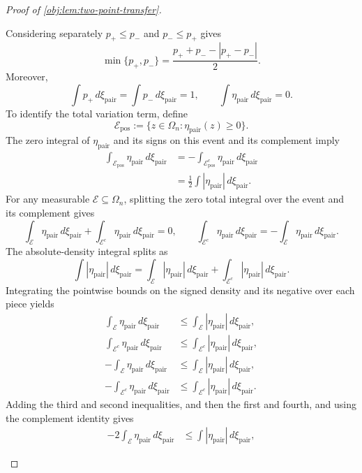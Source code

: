 \begin{proof}[Proof of \cref{obj:lem:two-point-transfer}]
\begin{enumerate}
Considering separately \(p_+\le p_-\) and \(p_-\le p_+\) gives
\[
\min\{p_+,p_-\}
=
\frac{p_++p_--|p_+-p_-|}{2}.
\]
Moreover,
\[
\int p_+\,d\xi_{\mathrm{pair}}
=
\int p_-\,d\xi_{\mathrm{pair}}
=1,
\qquad
\int\eta_{\mathrm{pair}}\,d\xi_{\mathrm{pair}}=0.
\]
To identify the total variation term, define
\[
\mathcal E_{\mathrm{pos}}
:=
\{z\in\Omega_n:\eta_{\mathrm{pair}}(z)\ge0\}.
\]
The zero integral of \(\eta_{\mathrm{pair}}\) and its signs on this event and its complement imply
\[
\begin{aligned}
\int_{\mathcal E_{\mathrm{pos}}}\eta_{\mathrm{pair}}\,d\xi_{\mathrm{pair}}
&=
-\int_{\mathcal E_{\mathrm{pos}}^c}\eta_{\mathrm{pair}}\,d\xi_{\mathrm{pair}}
\\
&=
\frac12\int|\eta_{\mathrm{pair}}|\,d\xi_{\mathrm{pair}}.
\end{aligned}
\]
For any measurable \(\mathcal E\subseteq\Omega_n\), splitting the zero total integral over the event and its complement gives
\[
\int_{\mathcal E}\eta_{\mathrm{pair}}\,d\xi_{\mathrm{pair}}
+
\int_{\mathcal E^c}\eta_{\mathrm{pair}}\,d\xi_{\mathrm{pair}}
=0,
\qquad
\int_{\mathcal E^c}\eta_{\mathrm{pair}}\,d\xi_{\mathrm{pair}}
=
-\int_{\mathcal E}\eta_{\mathrm{pair}}\,d\xi_{\mathrm{pair}}.
\]
The absolute-density integral splits as
\[
\int|\eta_{\mathrm{pair}}|\,d\xi_{\mathrm{pair}}
=
\int_{\mathcal E}|\eta_{\mathrm{pair}}|\,d\xi_{\mathrm{pair}}
+
\int_{\mathcal E^c}|\eta_{\mathrm{pair}}|\,d\xi_{\mathrm{pair}}.
\]
Integrating the pointwise bounds on the signed density and its negative over each piece yields
\[
\begin{aligned}
\int_{\mathcal E}\eta_{\mathrm{pair}}\,d\xi_{\mathrm{pair}}
&\le\int_{\mathcal E}|\eta_{\mathrm{pair}}|\,d\xi_{\mathrm{pair}},
\\
\int_{\mathcal E^c}\eta_{\mathrm{pair}}\,d\xi_{\mathrm{pair}}
&\le\int_{\mathcal E^c}|\eta_{\mathrm{pair}}|\,d\xi_{\mathrm{pair}},
\\
-\int_{\mathcal E}\eta_{\mathrm{pair}}\,d\xi_{\mathrm{pair}}
&\le\int_{\mathcal E}|\eta_{\mathrm{pair}}|\,d\xi_{\mathrm{pair}},
\\
-\int_{\mathcal E^c}\eta_{\mathrm{pair}}\,d\xi_{\mathrm{pair}}
&\le\int_{\mathcal E^c}|\eta_{\mathrm{pair}}|\,d\xi_{\mathrm{pair}}.
\end{aligned}
\]
Adding the third and second inequalities, and then the first and fourth, and using the complement identity gives
\[
\begin{aligned}
-2\int_{\mathcal E}\eta_{\mathrm{pair}}\,d\xi_{\mathrm{pair}}
&\le\int|\eta_{\mathrm{pair}}|\,d\xi_{\mathrm{pair}},

\end{aligned}\]
\end{enumerate}
\end{proof}
